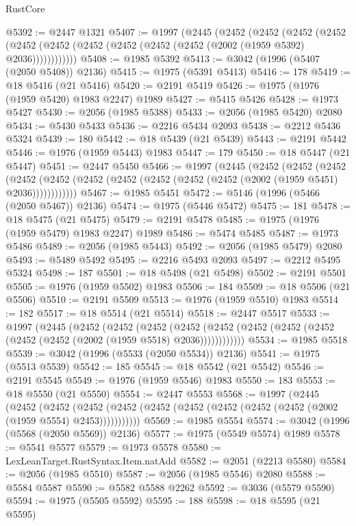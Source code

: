 \begin{lexlean}{RustCore}
\begin{coremodule}
@5392 := @2447 @1321
@5407 := @1997
    (@2445
      (@2452
        (@2452
          (@2452
            (@2452 (@2452 (@2452 (@2452 (@2452 (@2452 (@2452 (@2002 (@1959 @5392) @2036))))))))))))
@5408 := @1985 @5392
@5413 := @3042 (@1996 (@5407 (@2050 @5408)) @2136)
@5415 := @1975 (@5391 @5413)
@5416 := 178
@5419 := @18 @5416 (@21 @5416)
@5420 := @2191 @5419
@5426 := @1975 (@1976 (@1959 @5420) @1983 @2247) @1989
@5427 := @5415 @5426
@5428 := @1973 @5427
@5430 := @2056 (@1985 @5388)
@5433 := @2056 (@1985 @5420) @2080
@5434 := @5430 @5433
@5436 := @2216 @5434 @2093
@5438 := @2212 @5436 @5324
@5439 := 180
@5442 := @18 @5439 (@21 @5439)
@5443 := @2191 @5442
@5446 := @1976 (@1959 @5443) @1983
@5447 := 179
@5450 := @18 @5447 (@21 @5447)
@5451 := @2447 @5450
@5466 := @1997
    (@2445
      (@2452
        (@2452
          (@2452
            (@2452 (@2452 (@2452 (@2452 (@2452 (@2452 (@2452 (@2002 (@1959 @5451) @2036))))))))))))
@5467 := @1985 @5451
@5472 := @5146 (@1996 (@5466 (@2050 @5467)) @2136)
@5474 := @1975 (@5446 @5472)
@5475 := 181
@5478 := @18 @5475 (@21 @5475)
@5479 := @2191 @5478
@5485 := @1975 (@1976 (@1959 @5479) @1983 @2247) @1989
@5486 := @5474 @5485
@5487 := @1973 @5486
@5489 := @2056 (@1985 @5443)
@5492 := @2056 (@1985 @5479) @2080
@5493 := @5489 @5492
@5495 := @2216 @5493 @2093
@5497 := @2212 @5495 @5324
@5498 := 187
@5501 := @18 @5498 (@21 @5498)
@5502 := @2191 @5501
@5505 := @1976 (@1959 @5502) @1983
@5506 := 184
@5509 := @18 @5506 (@21 @5506)
@5510 := @2191 @5509
@5513 := @1976 (@1959 @5510) @1983
@5514 := 182
@5517 := @18 @5514 (@21 @5514)
@5518 := @2447 @5517
@5533 := @1997
    (@2445
      (@2452
        (@2452
          (@2452
            (@2452 (@2452 (@2452 (@2452 (@2452 (@2452 (@2452 (@2002 (@1959 @5518) @2036))))))))))))
@5534 := @1985 @5518
@5539 := @3042 (@1996 (@5533 (@2050 @5534)) @2136)
@5541 := @1975 (@5513 @5539)
@5542 := 185
@5545 := @18 @5542 (@21 @5542)
@5546 := @2191 @5545
@5549 := @1976 (@1959 @5546) @1983
@5550 := 183
@5553 := @18 @5550 (@21 @5550)
@5554 := @2447 @5553
@5568 := @1997
    (@2445
      (@2452
        (@2452
          (@2452 (@2452 (@2452 (@2452 (@2452 (@2452 (@2452 (@2002 (@1959 @5554) @2453)))))))))))
@5569 := @1985 @5554
@5574 := @3042 (@1996 (@5568 (@2050 @5569)) @2136)
@5577 := @1975 (@5549 @5574) @1989
@5578 := @5541 @5577
@5579 := @1973 @5578
@5580 := LexLeanTarget.RustSyntax.Item.natAdd
@5582 := @2051 (@2213 @5580)
@5584 := @2056 (@1985 @5510)
@5587 := @2056 (@1985 @5546) @2080
@5588 := @5584 @5587
@5590 := @5582 @5588 @2262
@5592 := @3036 (@5579 @5590)
@5594 := @1975 (@5505 @5592)
@5595 := 188
@5598 := @18 @5595 (@21 @5595)

\end{coremodule}
\end{lexlean}
